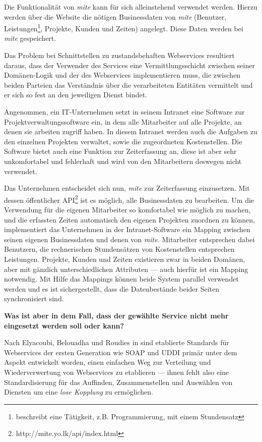 Die Funktionalität von \emph{mite} kann für sich alleinstehend verwendet werden. Hierzu werden über die Website die nötigen Businessdaten von \emph{mite} (Benutzer, Leistungen\footnote{beschreibt eine Tätigkeit, z.B. Programmierung, mit einem Stundensatz}, Projekte, Kunden und Zeiten) angelegt. Diese Daten werden bei \emph{mite} gespeichert. 

Das Problem bei Schnittstellen zu zustandsbehaften Webservices resultiert daraus, dass der Verwender des Services eine Vermittlungsschicht zwischen seiner Domänen-Logik und der des Webservices implementieren muss, die zwischen beiden Parteien das Verständnis über die verarbeiteten Entitäten vermittelt und er sich so fest an den jeweiligen Dienst bindet.

Angenommen, ein IT-Unternehmen setzt in seinem Intranet eine Software zur Projektverwaltungssoftware ein, in dem alle Mitarbeiter auf alle Projekte, an denen sie arbeiten zugriff haben. In diesem Intranet werden auch die Aufgaben zu den einzelnen Projekten verwaltet, sowie die zugeordneten Kostenstellen. Die Software bietet auch eine Funktion zur Zeiterfassung an, diese ist aber sehr unkomfortabel und fehlerhaft und wird von den Mitarbeitern deswegen nicht verwendet. 

Das Unternehmen entscheidet sich nun, \emph{mite} zur Zeiterfassung einzusetzen. Mit dessen öffentlicher API\footnote{http://mite.yo.lk/api/index.html} ist es möglich, alle Businessdaten zu bearbeiten. Um die Verwendung für die eigenen Mitarbeiter so komfortabel wie möglich zu machen, und die erfassten Zeiten automatisch den eigenen Projekten zuordnen zu können, implementiert das Unternehmen in der Intranet-Software ein Mapping zwischen seinen eigenen Businessdaten und denen von \emph{mite}. Mitarbeiter entsprechen dabei Benutzern, die rechnerischen Stundensätzen von Kostenstellen entsprechen Leistungen. Projekte, Kunden und Zeiten existieren zwar in beiden Domänen, aber mit gänzlich unterschiedlichen Attributen --- auch hierfür ist ein Mapping notwendig. Mit Hilfe das Mappings können beide System parallel verwendet werden und es ist sichergestellt, dass die Datenbestände beider Seiten synchronisiert sind.

\textbf{Was ist aber in dem Fall, dass der gewählte Service nicht mehr eingesetzt werden soll oder kann?}

Nach Elyacoubi, Belouadha und Roudies in \cite{ei-sawsdl} sind etablierte Standards für Webservices der ersten Generation wie \ac{SOAP} und \ac{UDDI} primär unter dem Aspekt entwickelt worden, einen einfachen Weg zur Verteilung und Wiederverwertung von Webservices zu etablieren --- ihnen fehlt also eine Standardisierung für das Auffinden, Zusammenstellen und Auswählen von Diensten um eine \emph{lose Kopplung} zu ermöglichen. 

